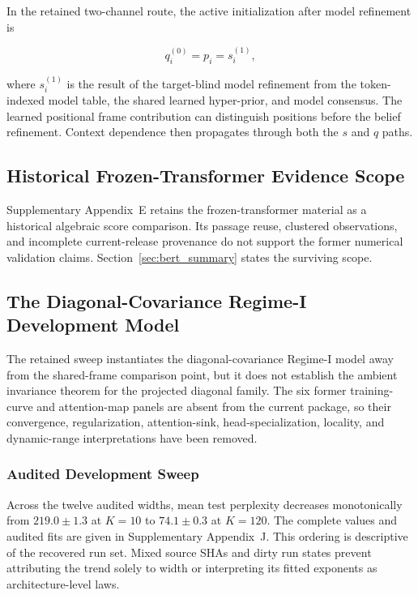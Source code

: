 \documentclass[twoside,11pt]{article}
\begin{document}
In the retained two-channel route, the active initialization after model refinement is

\begin{equation}
q_i^{(0)} = p_i = s_i^{(1)},
\end{equation}

where $s_i^{(1)}$ is the result of the target-blind model refinement from the token-indexed model table, the shared learned hyper-prior, and model consensus. The learned positional frame contribution can distinguish positions before the belief refinement. Context dependence then propagates through both the $s$ and $q$ paths.

\subsection{Historical Frozen-Transformer Evidence Scope}

Supplementary Appendix~E retains the frozen-transformer material as a historical algebraic score comparison. Its passage reuse, clustered observations, and incomplete current-release provenance do not support the former numerical validation claims. Section~\ref{sec:bert_summary} states the surviving scope.

\subsection{The Diagonal-Covariance Regime-I Development Model}
\label{sec:glk_lm}

The retained sweep instantiates the diagonal-covariance Regime-I model away from the shared-frame comparison point, but it does not establish the ambient invariance theorem for the projected diagonal family. The six former training-curve and attention-map panels are absent from the current package, so their convergence, regularization, attention-sink, head-specialization, locality, and dynamic-range interpretations have been removed.

\subsubsection{Audited Development Sweep}

Across the twelve audited widths, mean test perplexity decreases monotonically from $219.0\pm1.3$ at $K=10$ to $74.1\pm0.3$ at $K=120$. The complete values and audited fits are given in Supplementary Appendix~J. This ordering is descriptive of the recovered run set. Mixed source SHAs and dirty run states prevent attributing the trend solely to width or interpreting its fitted exponents as architecture-level laws.
\end{document}
